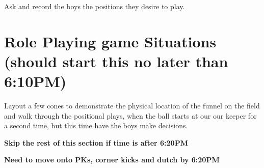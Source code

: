 \documentclass[10pt,letterpaper]{article}
\newenvironment{agendablock}[1]{%
    \tcolorbox[beamer,%
    noparskip,breakable,
    colback=LightGray,colframe=Black,%
    colbacklower=Gray!75!LightGray,%
    title=#1]}%
    {\endtcolorbox}
\newenvironment{evenBlock}[1]{%
    \tcolorbox[beamer,%
    noparskip,breakable,
    colback=LightGreen,colframe=DarkGreen,%
    colbacklower=LimeGreen!75!LightGreen,%
    title=#1]}%
    {\endtcolorbox}
\begin{document}
\begin{agendablock}{Desired Positions (3 min)}
Ask and record the boys the positions they desire to play.
\end{agendablock}


\section{Role Playing game Situations (should start this no later than 6:10PM)}

\begin{evenBlock}{Funnel Positioning (10 min)}
    Layout a few cones to demonstrate the physical location of the funnel on the field and walk through the positional plays, when the ball starts at our our keeper for a second time, but this time have the boys make decisions.
\end{evenBlock}

\textbf{Skip the rest of this section if time is after 6:20PM}

\textbf{Need to move onto PKs, corner kicks and dutch by 6:20PM}
\end{document}
